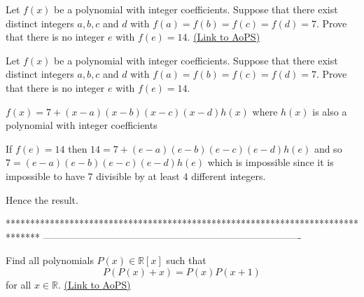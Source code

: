 \begin{problem}
	Let $ f(x)$ be a polynomial with integer coefficients. Suppose that there exist distinct integers $ a, b, c$ and $ d$ with $ f(a)=f(b)=f(c)=f(d)=7$. Prove that there is no integer $ e$ with $ f(e) = 14$.
	\flushright \href{https://artofproblemsolving.com/community/c6h316322}{(Link to AoPS)}
\end{problem}



\begin{solution}
	\begin{tcolorbox}Let $ f(x)$ be a polynomial with integer coefficients. Suppose that there exist distinct integers $ a, b, c$ and $ d$ with $ f(a) = f(b) = f(c) = f(d) = 7$. Prove that there is no integer $ e$ with $ f(e) = 14$.\end{tcolorbox}

$ f(x) = 7 + (x - a)(x - b)(x - c)(x - d)h(x)$ where $ h(x)$ is also a polynomial with integer coefficients

If $ f(e) = 14$ then $ 14 = 7 + (e - a)(e - b)(e - c)(e - d)h(e)$ and so  $ 7 = (e - a)(e - b)(e - c)(e - d)h(e)$ which is impossible since it is impossible to have $ 7$ divisible by at least $ 4$ different integers.

Hence the result.
\end{solution}
*******************************************************************************
-------------------------------------------------------------------------------

\begin{problem}
	Find all polynomials $ P(x)\in\mathbb R[x]$ such that \[ P(P(x)+x)=P(x)P(x+1)\] for all $x \in \mathbb R$.
	\flushright \href{https://artofproblemsolving.com/community/c6h316385}{(Link to AoPS)}
\end{problem}



